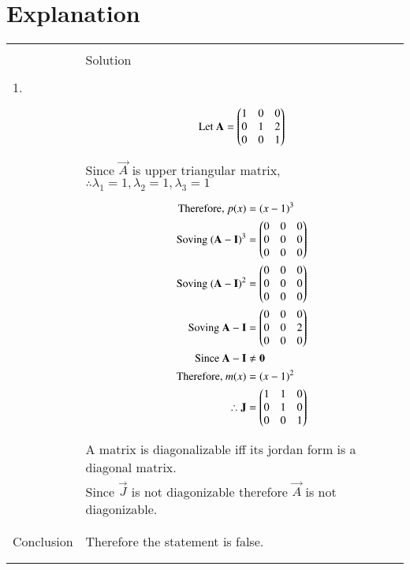 \documentclass[journal,12pt]{IEEEtran}
\begin{document}
\section{\textbf{Explanation}}
\renewcommand{\thetable}{2}
\begin{longtable}{|l|l|}
\hline
\multirow{3}{*}{} & \\
Statement&Solution\\
\hline
&\\
1.&\\
&\parbox{6cm}{\begin{align*}
    \mbox{Let }\mathbf{A}&=\begin{pmatrix}1&0&0\\0&1&2\\0&0&1\end{pmatrix}\\
\end{align*}}\\
&Since $\vec{A}$ is upper triangular matrix, $\therefore \lambda_{1}=1,\lambda_{2}=1,\lambda_{3}=1$ \\
&\parbox{6cm}{\begin{align*}
    \mbox{Therefore, }p(x)&=(x-1)^3\\
    \mbox{Soving }(\mathbf{A}-\mathbf{I})^3&=\begin{pmatrix}0&0&0\\0&0&0\\0&0&0\end{pmatrix}\\
    \mbox{Soving }(\mathbf{A}-\mathbf{I})^2&=\begin{pmatrix}0&0&0\\0&0&0\\0&0&0\end{pmatrix}\\
    \mbox{Soving }\mathbf{A}-\mathbf{I}&=\begin{pmatrix}0&0&0\\0&0&2\\0&0&0\end{pmatrix}\\
    \mbox{Since }\mathbf{A}-\mathbf{I}&\neq \mathbf{0}\\
    \mbox{Therefore, }m(x)&=(x-1)^2\\
    \therefore \mathbf{J}&=\begin{pmatrix}1&1&0\\0&1&0\\0&0&1\end{pmatrix}
\end{align*}}\\
&A matrix is diagonalizable iff its jordan form is a diagonal matrix.\\
&Since $\vec{J}$ is not diagonizable therefore $\vec{A}$ is not diagonizable.\\
&\\
\hline
&\\
Conclusion&Therefore the statement is false.\\
&\\
\hline
\pagebreak
\hline
&\\

\end{longtable}
\end{document}
